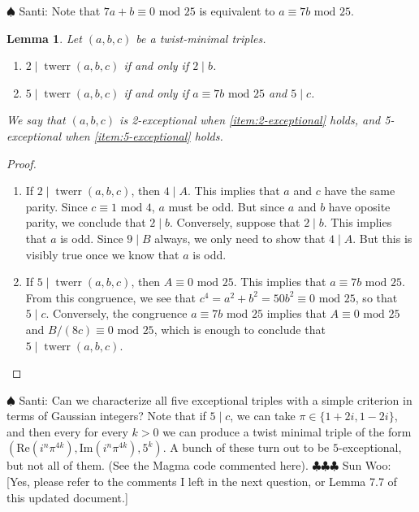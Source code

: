 \documentclass[12pt]{amsart}
\newcounter{counter}[section] %
\numberwithin{equation}{section} %
\newtheorem{lemma}[counter]{Lemma}
\theoremstyle{definition} \newtheorem{definition}[counter]{Definition}
\theoremstyle{remark} \newtheorem{nonexam}[counter]{Non-example}
\newcommand{\md}{\text{ mod }} %
\newcommand{\cdef}[1]{\textsf{#1}} %
\renewcommand{\Re}{\mathrm{Re}} %
\renewcommand{\Im}{\mathrm{Im}} %
\newcommand{\santi}[1]{{\color{cyan} \sf
    $\spadesuit$ Santi: #1}}
\newcommand{\spark}[1]{{\color{olive} \sf
    $\clubsuit\clubsuit\clubsuit$ Sun Woo: [#1]}}
\DeclareMathOperator{\twerr}{twerr} %
\begin{document}
\santi{Note that $7a + b \equiv 0 \md 25$ is equivalent to $a \equiv 7b \md
  25$.}
\begin{lemma}
  \label{lemma:exceptional-triples}
  Let $(a,b,c)$ be a twist-minimal triples.
  \begin{enumerate}[label=(\alph*)]
  \item \label{item:2-exceptional} $2 \mid \twerr(a,b,c)$ if and only if $2 \mid b$.
  \item \label{item:5-exceptional} $5 \mid \twerr(a,b,c)$ if and only if $a \equiv 7b \md 25$ and $5
    \mid c$.
  \end{enumerate}
  We say that $(a,b,c)$ is \cdef{2-exceptional} when \ref{item:2-exceptional}
  holds, and \cdef{5-exceptional} when \ref{item:5-exceptional} holds.
\end{lemma}
\begin{proof}
  \hfill
  \begin{enumerate}[label=(\alph*)]
  \item If $2 \mid \twerr(a,b,c)$, then $4 \mid A$. This implies that $a$ and
    $c$ have the same parity. Since $c \equiv 1 \md 4$, $a$ must be odd. But
    since $a$ and $b$ have oposite parity, we conclude that $2 \mid b$.
    Conversely, suppose that $2 \mid b$. This implies that $a$ is odd. Since $9
    \mid B$ always, we only need to show that $4 \mid A$. But this is visibly
    true once we know that $a$ is odd.
  \item If $5 \mid \twerr(a,b,c)$, then $A \equiv 0 \md 25$. This implies that
    $a \equiv 7b \md 25$. From this congruence, we see that $c^4 = a^2 +
    b^2 = 50b^2 \equiv 0 \md 25$, so that $5 \mid c$. Conversely, the
    congruence $a \equiv 7b \md 25$ implies that $A \equiv 0 \md 25$ and $B/(8c)
    \equiv 0 \md 25$, which is enough to conclude that $5 \mid \twerr(a,b,c)$.
  \end{enumerate}
\end{proof}
\santi{Can we characterize all five exceptional triples with a simple criterion
in terms of Gaussian integers? Note that if $5 \mid c$, we can take $\pi \in
\{1 + 2i, 1-2i\}$, and then every for every $k > 0$ we can produce a twist
minimal triple of the form $(\Re(i^n\pi^{4k}), \Im(i^n\pi^{4k}), 5^k)$. A bunch of
these turn out to be $5$-exceptional, but not all of them. (See the Magma code
commented here)}.
\spark{Yes, please refer to the comments I left in the next question, or Lemma 7.7 of this updated document.}

\end{document}

